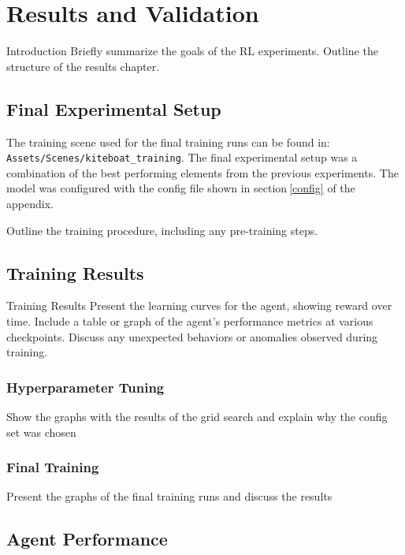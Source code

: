 

\let\textcircled=\pgftextcircled\chapter{Results and Validation}\label{chap:results}

Introduction
Briefly summarize the goals of the RL experiments.
Outline the structure of the results chapter.

\section{Final Experimental Setup}
The training scene used for the final training runs can be found in:
\newline
\texttt{Assets/Scenes/kiteboat\_training}. The final experimental setup was a combination of the best performing elements from the previous experiments. The model was configured with the config file shown in section$~$\ref{config} of the appendix. 


Outline the training procedure, including any pre-training steps.

\section{Training Results}
Training Results
Present the learning curves for the agent, showing reward over time.
Include a table or graph of the agent’s performance metrics at various checkpoints.
Discuss any unexpected behaviors or anomalies observed during training.

\subsection{Hyperparameter Tuning}\label{sec:hyperparameter_tuning}

Show the graphs with the results of the grid search and explain why the config set was chosen
\subsection{Final Training}

Present the graphs of the final training runs and discuss the results

\section{Agent Performance}

